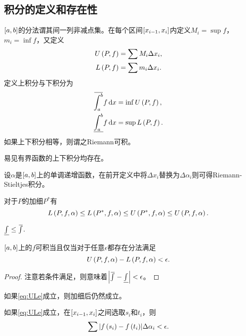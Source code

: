 \documentclass{ctexrep}
\begin{document}
  \subsection{积分的定义和存在性}
  \begin{definition}
    $\left[a,b\right]$的分法谓其间一列非减点集。在每个区间$\left[x_{i-1},x_i\right]$内定义$M_i=\sup f$，$m_i=\inf f$，又定义
    \begin{align*}
      U\left(P,f\right) &= \sum M_i \Delta x_i, \\
      L\left(P,f\right) &= \sum m_i \Delta x_i.
    \end{align*}
    定义上积分与下积分为
    \begin{align*}
      \supint{a}{b} f\intpostf{x} &= \inf U\pare{P,f},\\
      \infint{a}{b} f\intpostf{x} &= \sup L\pare{P,f}.
    \end{align*}
    如果上下积分相等，则谓之Riemann可积。
  \end{definition}
  易见有界函数的上下积分均存在。
  \begin{definition}
    设$\alpha$是$\left[a,b\right]$上的单调递增函数，在前开定义中将$\Delta x_i$替换为$\Delta \alpha_i$则可得Riemann-Stieltjes积分。
  \end{definition}
  \begin{theorem}
    对于$P$的加细$P^*$有
    \begin{equation*}
      L\left(P,f,\alpha\right)\le L\left(P^*,f,\alpha\right)\le U\left(P^*,f,\alpha\right)\le U\left(P,f,\alpha\right).
    \end{equation*}
  \end{theorem}
  \begin{theorem}
    $\infint{}{} \le \supint{}{}.$
  \end{theorem}
  \begin{theorem}
    $\left[a,b\right]$上的$f$可积当且仅当对于任意$\epsilon$都存在分法满足
    \begin{equation}
      \label{eq:ULe}
      U\left(P,f,\alpha\right) - L\left(P,f,\alpha\right) < \epsilon.
    \end{equation}
  \end{theorem}
  \begin{proof}
    注意若条件满足，则意味着$\abs{\supint{}{}-\infint{}{}}<\epsilon$。
  \end{proof}
  \begin{theorem}
    如果\eqref{eq:ULe}成立，则加细后仍然成立。
  \end{theorem}
  \begin{theorem}
    \label{thm:stbetweenx}
    如果\eqref{eq:ULe}成立，在$\left[x_{i-1},x_i\right]$之间选取$s_i$和$t_i$，则
    \[ \sum \abs{f\left(s_i\right)-f\left(t_i\right)}\Delta\alpha_i < \epsilon. \]
  \end{theorem}
\end{document}
